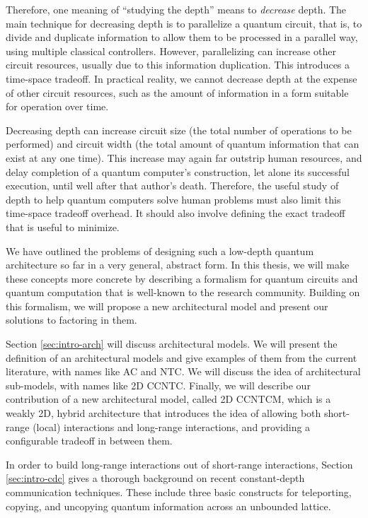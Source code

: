 Therefore, one meaning of ``studying the depth'' means to \emph{decrease} depth. The main technique for decreasing
depth is to parallelize a quantum circuit, that is, to divide and duplicate information to allow them to be processed
in a parallel way, using multiple classical controllers. However, parallelizing can increase other circuit resources,
usually due to this information duplication. This introduces a time-space tradeoff. In practical reality, we cannot
decrease depth at the expense of other circuit resources, such as the amount of information in a form suitable for
operation over time.

Decreasing depth can increase circuit size (the total number of operations to be performed) and circuit width
(the total amount of quantum information that can exist at any one time). This increase may again far
outstrip human resources, and delay completion of a quantum computer's construction, let alone its
successful execution, until well after that author's death. Therefore, the useful study of depth to help
quantum computers solve human problems must also limit this time-space tradeoff overhead. It should also
involve defining the exact tradeoff that is useful to minimize.

We have outlined the problems of designing such a low-depth quantum architecture so far in a very general,
abstract form. In this thesis, we will make these concepts more concrete by describing a formalism for
quantum circuits and quantum computation that is well-known to the research community.
Building on this formalism, we will propose a new architectural model and present our solutions to factoring in them.


Section \ref{sec:intro-arch} will discuss architectural models. We will present the definition of an
architectural models and give examples of them from the
current literature, with names like \textsf{AC} and \textsf{NTC}. We will discuss the idea of architectural
sub-models, with names like \textsf{2D CCNTC}. Finally,
we will describe our contribution of a new architectural model, called \textsf{2D CCNTCM}, which is a weakly 2D,
hybrid architecture that introduces the idea of allowing both short-range (local) interactions and long-range
interactions, and providing a configurable tradeoff in between them.

In order to build long-range interactions out of short-range interactions, Section \ref{sec:intro-cdc} 
gives a thorough background on recent constant-depth communication techniques. These include three
basic constructs for teleporting, copying, and uncopying quantum information across an unbounded
lattice.

